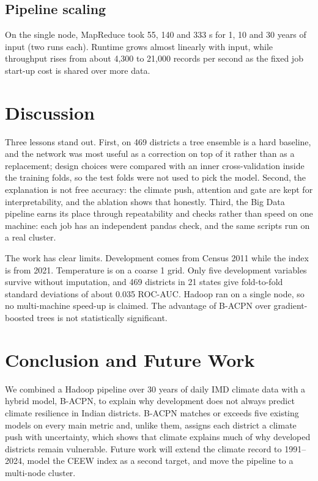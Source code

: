 \documentclass[conference]{IEEEtran}
\begin{document}
\subsection{Pipeline scaling}
On the single node, MapReduce took 55, 140 and 333 s for 1, 10 and 30 years of input (two runs each). Runtime grows almost linearly with input, while throughput rises from about 4,300 to 21,000 records per second as the fixed job start-up cost is shared over more data.

\FloatBarrier
\section{Discussion}
Three lessons stand out. First, on 469 districts a tree ensemble is a hard baseline, and the network was most useful as a correction on top of it rather than as a replacement; design choices were compared with an inner cross-validation inside the training folds, so the test folds were not used to pick the model. Second, the explanation is not free accuracy: the climate push, attention and gate are kept for interpretability, and the ablation shows that honestly. Third, the Big Data pipeline earns its place through repeatability and checks rather than speed on one machine: each job has an independent pandas check, and the same scripts run on a real cluster.

The work has clear limits. Development comes from Census 2011 while the index is from 2021. Temperature is on a coarse 1\textdegree{} grid. Only five development variables survive without imputation, and 469 districts in 21 states give fold-to-fold standard deviations of about 0.035 ROC-AUC. Hadoop ran on a single node, so no multi-machine speed-up is claimed. The advantage of B-ACPN over gradient-boosted trees is not statistically significant.

\section{Conclusion and Future Work}
We combined a Hadoop pipeline over 30 years of daily IMD climate data with a hybrid model, B-ACPN, to explain why development does not always predict climate resilience in Indian districts. B-ACPN matches or exceeds five existing models on every main metric and, unlike them, assigns each district a climate push with uncertainty, which shows that climate explains much of why developed districts remain vulnerable. Future work will extend the climate record to 1991--2024, model the CEEW index as a second target, and move the pipeline to a multi-node cluster.
\end{document}
